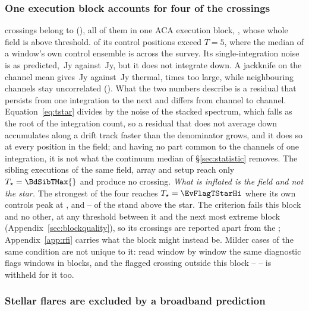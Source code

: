 \subsubsection{One execution block accounts for four of the crossings}
\label{sec:bdblock}

\BdNCross{} crossings belong to \BdStar{} (\BdAlias), all of them in one
ACA execution block, \texttt{\BdBlock}, whose whole field is above threshold.
\BdNCtrlAbove{} of its \BdNCtrl{} control positions exceed $T=5$, where the
median of a window's own control ensemble is \BdSurvCtrlMed{} across the
survey. Its single-integration noise is as predicted, \BdRmsMeas\,Jy against
\BdRmsPred\,Jy, but it does not integrate down. A jackknife on the channel
mean gives \BdJack\,Jy against \BdThermal\,Jy thermal, \BdJackRatio{} times
too large, while neighbouring channels stay uncorrelated (\BdChanCorr). What the two numbers describe is a
residual that persists from one integration to the next and differs from
channel to channel. Equation~\ref{eq:tstar} divides by the noise of the
stacked spectrum, which falls as the root of the integration count, so a
residual that does not average down accumulates along a drift track faster
than the denominator grows, and it does so at every position in the field; and
having no part common to the channels of one integration, it is not what the
continuum median of \S\ref{sec:statistic} removes. The \BdNSibling{}
sibling executions of the same field, array and setup reach only
$T_\star=\BdSibTMax{}$ and produce no crossing. \emph{What is inflated is the field and not the star.} The strongest of the
four reaches $T_\star=\EvFlagTStarHi$ where its own controls peak at
\EvFlagCtrlAtHi, and \EvFlagNgeLo--\EvFlagNgeHi{} of the \BdNCtrl{} stand
above the star. The
criterion fails this block and no other, at any threshold between it and the
next most extreme block (Appendix~\ref{sec:blockquality}), so its
\BdNCross{} crossings are reported apart from the \EvNCrossQp{}; Appendix~\ref{app:rfi} carries what the block
might instead be. Milder cases of the same condition are not unique to it:
read window by window the same diagnostic flags \DqNWin{} windows in
\BkFlagNBlock{} blocks, and the \BkFlagNCrossOther{} flagged crossing outside
this block -- \BkFlagOtherStar{} -- is withheld for it too.

\subsubsection{Stellar flares are excluded by a broadband prediction}

